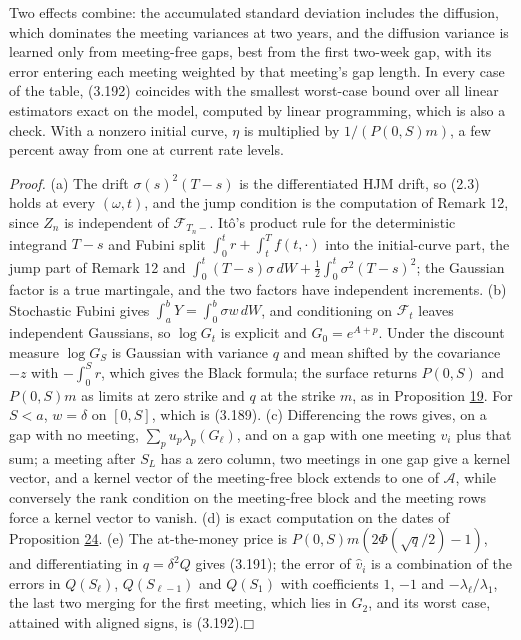 \documentclass[11pt]{article}
\providecommand{\square}{\mdlgwhtsquare}
\begin{document}
Two effects combine: the accumulated standard deviation includes the diffusion, which dominates the meeting variances at two years, and the diffusion variance is learned only from meeting-free gaps, best from the first two-week gap, with its error entering each meeting weighted by that meeting's gap length. In every case of the table, (3.192) coincides with the smallest worst-case bound over all linear estimators exact on the model, computed by linear programming, which is also a check. With a nonzero initial curve, \(\eta\) is multiplied by \(1/(P(0,S)m)\), a few percent away from one at current rate levels.

\emph{Proof.} (a) The drift \(\sigma(s)^2(T-s)\) is the differentiated HJM drift, so (2.3) holds at every \((\omega,t)\), and the jump condition is the computation of Remark 12, since \(Z_n\) is independent of \(\mathcal F_{T_n-}\). Itô's product rule for the deterministic integrand \(T-s\) and Fubini split \(\int_0^tr+\int_t^Tf(t,\cdot)\) into the initial-curve part, the jump part of Remark 12 and \(\int_0^t(T-s)\sigma\,dW+\tfrac12\int_0^t\sigma^2(T-s)^2\); the Gaussian factor is a true martingale, and the two factors have independent increments. (b) Stochastic Fubini gives \(\int_a^bY=\int_0^b\sigma w\,dW\), and conditioning on \(\mathcal F_t\) leaves independent Gaussians, so \(\log G_t\) is explicit and \(G_0=e^{A+p}\). Under the discount measure \(\log G_S\) is Gaussian with variance \(q\) and mean shifted by the covariance \(-z\) with \(-\int_0^Sr\), which gives the Black formula; the surface returns \(P(0,S)\) and \(P(0,S)m\) as limits at zero strike and \(q\) at the strike \(m\), as in Proposition \hyperref[res:Proposition-19]{19}. For \(S<a\), \(w=\delta\) on \([0,S]\), which is (3.189). (c) Differencing the rows gives, on a gap with no meeting, \(\sum_pu_p\lambda_p(G_\ell)\), and on a gap with one meeting \(v_i\) plus that sum; a meeting after \(S_L\) has a zero column, two meetings in one gap give a kernel vector, and a kernel vector of the meeting-free block extends to one of \(\mathcal A\), while conversely the rank condition on the meeting-free block and the meeting rows force a kernel vector to vanish. (d) is exact computation on the dates of Proposition \hyperref[res:Proposition-24]{24}. (e) The at-the-money price is \(P(0,S)m(2\Phi(\sqrt q/2)-1)\), and differentiating in \(q=\delta^2Q\) gives (3.191); the error of \(\hat v_i\) is a combination of the errors in \(Q(S_\ell)\), \(Q(S_{\ell-1})\) and \(Q(S_1)\) with coefficients \(1\), \(-1\) and \(-\lambda_\ell/\lambda_1\), the last two merging for the first meeting, which lies in \(G_2\), and its worst case, attained with aligned signs, is (3.192).\hfill$\square$
\end{document}
